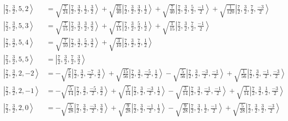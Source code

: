 \documentclass{report}
\newcommand{\ket}[1]{\left| #1 \right>} %
\begin{document}
\begin{align*}
\ket{ \frac{7}{2} ,  \frac{3}{2} ,  5 ,  2  } &=  \sqrt{  \frac{7}{24}  } \ket{ \frac{7}{2} ,  \frac{3}{2} ,  \frac{1}{2} ,  \frac{3}{2}  } + \sqrt{  \frac{21}{40}  } \ket{ \frac{7}{2} ,  \frac{3}{2} ,  \frac{3}{2} ,  \frac{1}{2}  } + \sqrt{  \frac{7}{40}  } \ket{ \frac{7}{2} ,  \frac{3}{2} ,  \frac{5}{2} ,  \frac{-1}{2}  } + \sqrt{  \frac{1}{120}  } \ket{ \frac{7}{2} ,  \frac{3}{2} ,  \frac{7}{2} ,  \frac{-3}{2}  } \\
\ket{ \frac{7}{2} ,  \frac{3}{2} ,  5 ,  3  } &=  \sqrt{  \frac{7}{15}  } \ket{ \frac{7}{2} ,  \frac{3}{2} ,  \frac{3}{2} ,  \frac{3}{2}  } + \sqrt{  \frac{7}{15}  } \ket{ \frac{7}{2} ,  \frac{3}{2} ,  \frac{5}{2} ,  \frac{1}{2}  } + \sqrt{  \frac{1}{15}  } \ket{ \frac{7}{2} ,  \frac{3}{2} ,  \frac{7}{2} ,  \frac{-1}{2}  } \\
\ket{ \frac{7}{2} ,  \frac{3}{2} ,  5 ,  4  } &=  \sqrt{  \frac{7}{10}  } \ket{ \frac{7}{2} ,  \frac{3}{2} ,  \frac{5}{2} ,  \frac{3}{2}  } + \sqrt{  \frac{3}{10}  } \ket{ \frac{7}{2} ,  \frac{3}{2} ,  \frac{7}{2} ,  \frac{1}{2}  } \\
\ket{ \frac{7}{2} ,  \frac{3}{2} ,  5 ,  5  } &=  \ket{ \frac{7}{2} ,  \frac{3}{2} ,  \frac{7}{2} ,  \frac{3}{2}  } \\
\ket{ \frac{7}{2} ,  \frac{3}{2} ,  2 ,  -2  } &=  - \sqrt{  \frac{5}{8}  } \ket{ \frac{7}{2} ,  \frac{3}{2} ,  \frac{-7}{2} ,  \frac{3}{2}  } + \sqrt{  \frac{15}{56}  } \ket{ \frac{7}{2} ,  \frac{3}{2} ,  \frac{-5}{2} ,  \frac{1}{2}  } - \sqrt{  \frac{5}{56}  } \ket{ \frac{7}{2} ,  \frac{3}{2} ,  \frac{-3}{2} ,  \frac{-1}{2}  } + \sqrt{  \frac{1}{56}  } \ket{ \frac{7}{2} ,  \frac{3}{2} ,  \frac{-1}{2} ,  \frac{-3}{2}  } \\
\ket{ \frac{7}{2} ,  \frac{3}{2} ,  2 ,  -1  } &=  - \sqrt{  \frac{5}{14}  } \ket{ \frac{7}{2} ,  \frac{3}{2} ,  \frac{-5}{2} ,  \frac{3}{2}  } + \sqrt{  \frac{5}{14}  } \ket{ \frac{7}{2} ,  \frac{3}{2} ,  \frac{-3}{2} ,  \frac{1}{2}  } - \sqrt{  \frac{3}{14}  } \ket{ \frac{7}{2} ,  \frac{3}{2} ,  \frac{-1}{2} ,  \frac{-1}{2}  } + \sqrt{  \frac{1}{14}  } \ket{ \frac{7}{2} ,  \frac{3}{2} ,  \frac{1}{2} ,  \frac{-3}{2}  } \\
\ket{ \frac{7}{2} ,  \frac{3}{2} ,  2 ,  0  } &=  - \sqrt{  \frac{5}{28}  } \ket{ \frac{7}{2} ,  \frac{3}{2} ,  \frac{-3}{2} ,  \frac{3}{2}  } + \sqrt{  \frac{9}{28}  } \ket{ \frac{7}{2} ,  \frac{3}{2} ,  \frac{-1}{2} ,  \frac{1}{2}  } - \sqrt{  \frac{9}{28}  } \ket{ \frac{7}{2} ,  \frac{3}{2} ,  \frac{1}{2} ,  \frac{-1}{2}  } + \sqrt{  \frac{5}{28}  } \ket{ \frac{7}{2} ,  \frac{3}{2} ,  \frac{3}{2} ,  \frac{-3}{2}  } \\

\end{align*}
\end{document}
